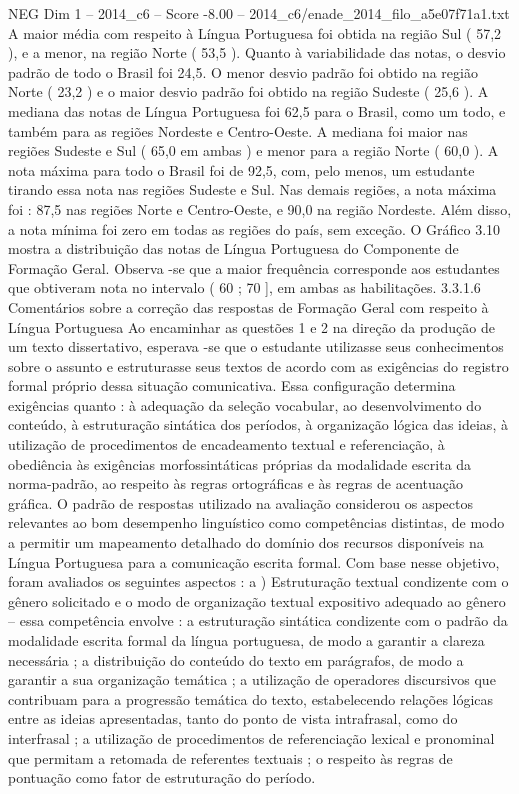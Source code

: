 \begin{textsample}{NEG Dim 1 – 2014\_c6 – Score -8.00 – 2014\_c6/enade\_2014\_filo\_a5e07f71a1.txt}
A maior média com respeito à Língua Portuguesa foi obtida na região Sul ( 57,2 ), e a menor, na região Norte ( 53,5 ).
Quanto à variabilidade das notas, o desvio padrão de todo o Brasil foi 24,5.
O menor desvio padrão foi obtido na região Norte ( 23,2 ) e o maior desvio padrão foi obtido na região Sudeste ( 25,6 ).
A mediana das notas de Língua Portuguesa foi 62,5 para o Brasil, como um todo, e também para as regiões Nordeste e Centro-Oeste.
A mediana foi maior nas regiões Sudeste e Sul ( 65,0 em ambas ) e menor para a região Norte ( 60,0 ).
A nota máxima para todo o Brasil foi de 92,5, com, pelo menos, um estudante tirando essa nota nas regiões Sudeste e Sul.
Nas demais regiões, a nota máxima foi : 87,5 nas regiões Norte e Centro-Oeste, e 90,0 na região Nordeste.
Além disso, a nota mínima foi zero em todas as regiões do país, sem exceção.
O Gráfico 3.10 mostra a distribuição das notas de Língua Portuguesa do Componente de Formação Geral.
Observa -se que a maior frequência corresponde aos estudantes que obtiveram nota no intervalo ( 60 ; 70 ], em ambas as habilitações. 3.3.1.6 Comentários sobre a correção das respostas de Formação Geral com respeito à Língua Portuguesa Ao encaminhar as questões 1 e 2 na direção da produção de um texto dissertativo, esperava -se que o estudante utilizasse seus conhecimentos sobre o assunto e estruturasse seus textos de acordo com as exigências do registro formal próprio dessa situação comunicativa.
Essa configuração determina exigências quanto : à adequação da seleção vocabular, ao desenvolvimento do conteúdo, à estruturação sintática dos períodos, à organização lógica das ideias, à utilização de procedimentos de encadeamento textual e referenciação, à obediência às exigências morfossintáticas próprias da modalidade escrita da norma-padrão, ao respeito às regras ortográficas e às regras de acentuação gráfica.
O padrão de respostas utilizado na avaliação considerou os aspectos relevantes ao bom desempenho linguístico como competências distintas, de modo a permitir um mapeamento detalhado do domínio dos recursos disponíveis na Língua Portuguesa para a comunicação escrita formal.
Com base nesse objetivo, foram avaliados os seguintes aspectos : a ) Estruturação textual condizente com o gênero solicitado e o modo de organização textual expositivo adequado ao gênero – essa competência envolve : a estruturação sintática condizente com o padrão da modalidade escrita formal da língua portuguesa, de modo a garantir a clareza necessária ; a distribuição do conteúdo do texto em parágrafos, de modo a garantir a sua organização temática ; a utilização de operadores discursivos que contribuam para a progressão temática do texto, estabelecendo relações lógicas entre as ideias apresentadas, tanto do ponto de vista intrafrasal, como do interfrasal ; a utilização de procedimentos de referenciação lexical e pronominal que permitam a retomada de referentes textuais ; o respeito às regras de pontuação como fator de estruturação do período.

\end{textsample}
